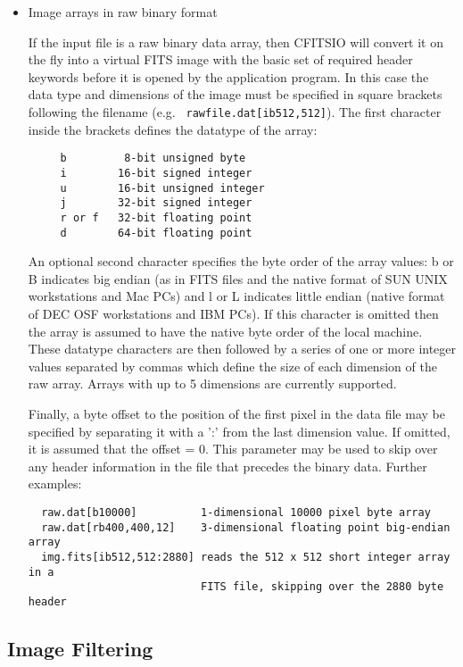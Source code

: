 \documentclass[11pt]{article}
\begin{document}
\begin{itemize}
\item Image arrays in raw binary format

If the input file is a raw binary data array, then CFITSIO will convert
it on the fly into a virtual FITS image with the basic set of required
header keywords before it is opened by the application program.  In
this case the data type and dimensions of the image must be specified
in square brackets following the filename (e.g. {\tt
rawfile.dat[ib512,512]}). The first character inside the brackets
defines the datatype of the array:

\begin{verbatim}
     b         8-bit unsigned byte
     i        16-bit signed integer
     u        16-bit unsigned integer
     j        32-bit signed integer
     r or f   32-bit floating point
     d        64-bit floating point
\end{verbatim}
An optional second character specifies the byte order of the array
values: b or B indicates big endian (as in FITS files and the native
format of SUN UNIX workstations and Mac PCs) and l or L indicates
little endian (native format of DEC OSF workstations and IBM PCs).  If
this character is omitted then the array is assumed to have the native
byte order of the local machine.  These datatype characters are then
followed by a series of one or more integer values separated by commas
which define the size of each dimension of the raw array.  Arrays with
up to 5 dimensions are currently supported.  

Finally, a byte offset to the position of the first pixel in the data
file may be specified by separating it with a ':' from the last
dimension value.  If omitted, it is assumed that the offset = 0.  This
parameter may be used to skip over any header information in the file
that precedes the binary data.  Further examples:
 
\begin{verbatim}
  raw.dat[b10000]          1-dimensional 10000 pixel byte array
  raw.dat[rb400,400,12]    3-dimensional floating point big-endian array
  img.fits[ib512,512:2880] reads the 512 x 512 short integer array in a
                           FITS file, skipping over the 2880 byte header
\end{verbatim}

\end{itemize}
\newpage

\subsection{Image Filtering}
\end{document}
